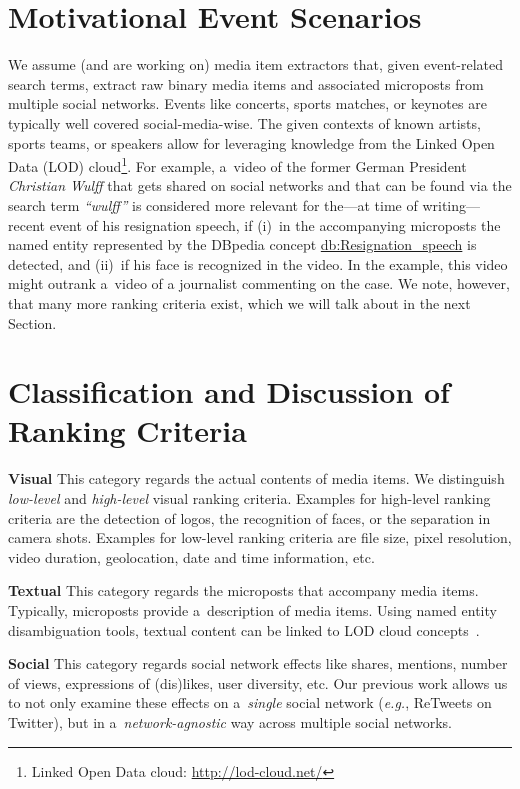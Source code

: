 \documentclass[runningheads,a4paper,11pt]{llncs}
\begin{document}
\section{Motivational Event Scenarios}
We assume (and are working on) media item extractors
that, given event-related search terms,
extract raw binary media items and associated microposts from multiple social networks.
Events like concerts, sports matches, or keynotes
are typically well covered social-media-wise.
The given contexts of known artists, sports teams, or speakers
allow for leveraging knowledge from the
Linked Open Data (LOD) cloud\footnote{Linked Open Data cloud: \url{http://lod-cloud.net/}}.
For example, a~video of the former German President \emph{Christian Wulff}
that gets shared on social networks and that can be found via the search term \emph{``wulff''}
is considered more relevant for the---at time of writing---recent
event of his resignation speech,
if (i)~in the accompanying microposts the named entity represented by the DBpedia concept
\url{db:Resignation_speech} is detected,
and (ii)~if his face is recognized in the video.
In the example, this video might outrank a~video
of a journalist commenting on the case.
We note, however, that many more ranking criteria exist,
which we will talk about in the next Section.

\section{Classification and Discussion of Ranking Criteria}
\textbf{Visual}
This category regards the actual contents of media items.
We distinguish \emph{low-level} and \emph{high-level} visual ranking criteria.
Examples for high-level ranking criteria are the detection of logos,
the recognition of faces, or the separation in camera shots.
Examples for low-level ranking criteria are file size, pixel resolution,
video duration, geolocation, date and time information, etc.

\noindent \textbf{Textual}
This category regards the microposts that accompany media items.
Typically, microposts provide a~description of media items.
Using named entity disambiguation tools,
textual content can be linked to LOD cloud concepts~\cite{Facebook2011}.

\noindent \textbf{Social}
This category regards social network effects like shares, mentions,
number of views, expressions of (dis)likes, user diversity, etc.
Our previous work allows us to not only examine these effects
on a~\emph{single} social network (\emph{e.g.}, ReTweets on Twitter),
but in a~\emph{network-agnostic} way across multiple social networks.
\end{document}
